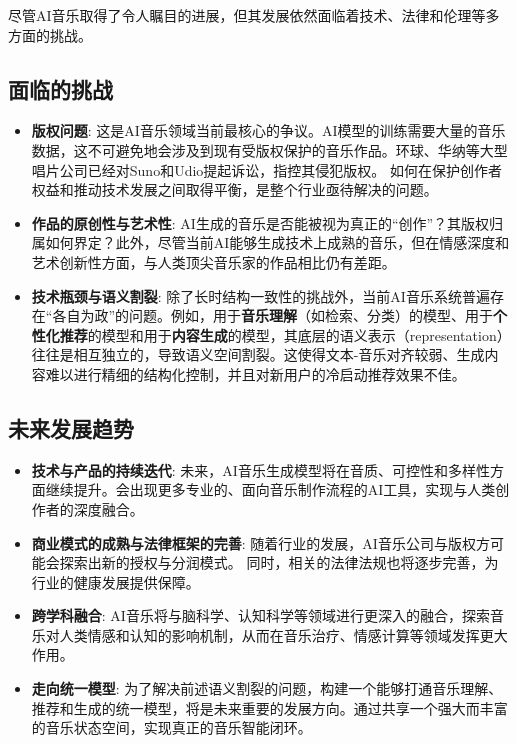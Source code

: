 \documentclass[12pt]{article}
\begin{document}
尽管AI音乐取得了令人瞩目的进展，但其发展依然面临着技术、法律和伦理等多方面的挑战。

\subsection{面临的挑战}
\begin{itemize}
    \item \textbf{版权问题}: 这是AI音乐领域当前最核心的争议。AI模型的训练需要大量的音乐数据，这不可避免地会涉及到现有受版权保护的音乐作品。环球、华纳等大型唱片公司已经对Suno和Udio提起诉讼，指控其侵犯版权。 如何在保护创作者权益和推动技术发展之间取得平衡，是整个行业亟待解决的问题。
    \item \textbf{作品的原创性与艺术性}: AI生成的音乐是否能被视为真正的“创作”？其版权归属如何界定？此外，尽管当前AI能够生成技术上成熟的音乐，但在情感深度和艺术创新性方面，与人类顶尖音乐家的作品相比仍有差距。
    \item \textbf{技术瓶颈与语义割裂}: 除了长时结构一致性的挑战外，当前AI音乐系统普遍存在“各自为政”的问题。例如，用于\textbf{音乐理解}（如检索、分类）的模型、用于\textbf{个性化推荐}的模型和用于\textbf{内容生成}的模型，其底层的语义表示（representation）往往是相互独立的，导致语义空间割裂。这使得文本-音乐对齐较弱、生成内容难以进行精细的结构化控制，并且对新用户的冷启动推荐效果不佳。
\end{itemize}

\subsection{未来发展趋势}
\begin{itemize}
    \item \textbf{技术与产品的持续迭代}: 未来，AI音乐生成模型将在音质、可控性和多样性方面继续提升。会出现更多专业的、面向音乐制作流程的AI工具，实现与人类创作者的深度融合。
    \item \textbf{商业模式的成熟与法律框架的完善}: 随着行业的发展，AI音乐公司与版权方可能会探索出新的授权与分润模式。 同时，相关的法律法规也将逐步完善，为行业的健康发展提供保障。
    \item \textbf{跨学科融合}: AI音乐将与脑科学、认知科学等领域进行更深入的融合，探索音乐对人类情感和认知的影响机制，从而在音乐治疗、情感计算等领域发挥更大作用。
    \item \textbf{走向统一模型}: 为了解决前述语义割裂的问题，构建一个能够打通音乐理解、推荐和生成的统一模型，将是未来重要的发展方向。通过共享一个强大而丰富的音乐状态空间，实现真正的音乐智能闭环。
\end{itemize}
\end{document}
